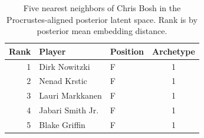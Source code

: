 \begin{table}[htbp]
  \centering\small
  \begin{tabular}{rllc}
    \toprule
    Rank & Player & Position & Archetype \\
    \midrule
    1 & Dirk Nowitzki & F & 1 \\
    2 & Nenad Krstic & F & 1 \\
    3 & Lauri Markkanen & F & 1 \\
    4 & Jabari Smith Jr. & F & 1 \\
    5 & Blake Griffin & F & 1 \\
    \bottomrule
  \end{tabular}
  \caption{Five nearest neighbors of Chris Bosh in the Procrustes-aligned posterior latent space. Rank is by posterior mean embedding distance.}
  \label{tab:Chris_Bosh_neighbors}
\end{table}

